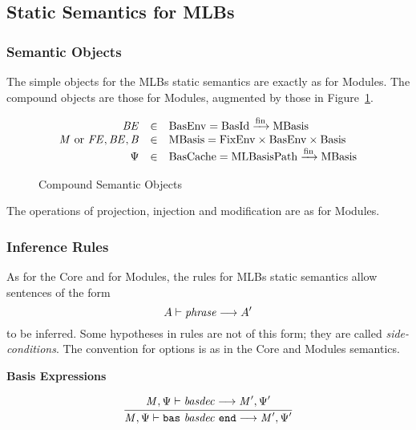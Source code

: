 \subsection{Static Semantics for MLBs}

\subsubsection{Semantic Objects}
%
The simple objects for the MLBs static semantics are exactly as for
Modules.  The compound objects are those for Modules, augmented by
those in Figure~\ref{fig:mlb:SS:CompoundObjects}.
\begin{figure}[h]
\begin{displaymath}
\begin{array}{rcl}
\mit{BE} & \in & \mrm{BasEnv} = \mrm{BasId} \xrightarrow{\mrm{fin}} \mrm{MBasis} \\
\mit{M} ~\mrm{or}~ \mit{FE},\mit{BE},\mit{B} & \in & 
\mrm{MBasis} = \mrm{FixEnv} \times \mrm{BasEnv} \times \mrm{Basis} \\
\Psi & \in & \mrm{BasCache} = \mrm{MLBasisPath} \xrightarrow{\mrm{fin}} \mrm{MBasis} 
\end{array}
\end{displaymath}
\caption{Compound Semantic Objects}\label{fig:mlb:SS:CompoundObjects}
\end{figure}
The operations of projection, injection and modification are as for
Modules.
%
\subsubsection{Inference Rules}

As for the Core and for Modules, the rules for MLBs static semantics
allow sentences of the form
\begin{displaymath}
A \vdash \mit{phrase} \longrightarrow A'
\end{displaymath}
to be inferred.  Some hypotheses in rules are not of this form; they
are called \emph{side-conditions}.  The convention for options is as
in the Core and Modules semantics.

\vspace{2\parsep}

{\large\noindent
\textbf{Basis Expressions} \hfill
{}
}

\begin{equation}
\judge{
\mit{M}, \Psi \vdash \mit{basdec} \longrightarrow \mit{M}', \Psi'
}{
\mit{M}, \Psi \vdash \mtt{bas}~ \mit{basdec} ~\mtt{end} \longrightarrow \mit{M}', \Psi'
}
\end{equation}

